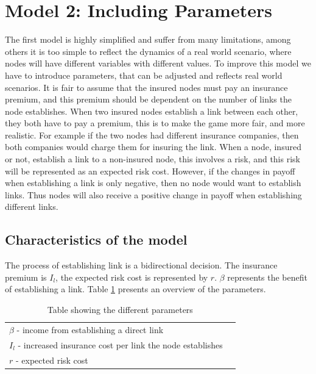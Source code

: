 \section{Model 2: Including Parameters}
The first model is highly simplified and suffer from many limitations, among others it is too simple to reflect the dynamics of a real world scenario, where nodes will have different variables with different values. To improve this model we have to introduce parameters, that can be adjusted and reflects real world scenarios.
It is fair to assume that the insured nodes must pay an insurance premium, and this premium should be dependent on the number of links the node establishes. When two insured nodes establish a link between each other, they both have to pay a premium, this is to make the game more fair, and more realistic. For example if the two nodes had different insurance companies, then both companies would charge them for insuring the link.
When a node, insured or not, establish a link to a non-insured node, this involves a risk, and this risk will be represented as an expected risk cost. However, if the changes in payoff when establishing a link is only negative, then no node would want to establish links. Thus nodes will also receive a positive change in payoff when establishing different links. 

\subsection{Characteristics of the model}

The process of establishing link is a bidirectional decision. 
 The insurance premium is $I_{l}$, the expected risk cost is represented by $r$. $\beta$ represents the benefit of establishing a link.  
Table \ref{tbl:simplegamepara} presents an overview of the parameters. 
\begin{table}[h]
\centering
\begin{tabular}{lc}
 \hline
  $\beta$ - income from establishing a direct link \\
  $I_{l}$ - increased insurance cost per link the node establishes\\
  $r$ - expected risk cost\\
  \hline
\end{tabular}
\caption{\label{tbl:simplegamepara} Table showing the different parameters}
\end{table}
